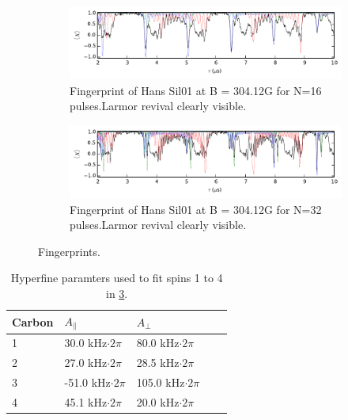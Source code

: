 

\begin{figure}[t]

    \begin{subfigure}[t]{\textwidth}\centering
        \centering
        \includegraphics{Img/fingerprint16.pdf}
        \caption{Fingerprint of Hans Sil01 at B = 304.12G for N=16 pulses.Larmor revival clearly visible. }
        \label{fig:FP16}
    \end{subfigure}

    \begin{subfigure}[t]{\textwidth}\centering
        \centering
        \includegraphics{Img/fingerprint32.pdf}
        \caption{Fingerprint of Hans Sil01 at B = 304.12G for N=32 pulses.Larmor revival clearly visible. }
        \label{fig:FP32}
    \end{subfigure}
    \caption{Fingerprints. }
    \label{fig:FP}
\end{figure}




\begin{table}[htbp]
    \begin{tabular}{lllll}
    Carbon &  $A_{\parallel} $ & $A_{\perp}$ \\ \hline
    1         & 30.0 kHz$\cdot 2 \pi$             & 80.0 kHz$\cdot 2 \pi$                \\
    2         & 27.0 kHz$\cdot 2 \pi$             & 28.5 kHz$\cdot 2 \pi$              \\
    3         & -51.0 kHz$\cdot 2 \pi$          & 105.0 kHz$\cdot 2 \pi$              \\
    4         & 45.1 kHz$\cdot 2 \pi$           & 20.0 kHz$\cdot 2 \pi$                \\
    \end{tabular}
    \caption{Hyperfine paramters used to fit spins 1 to 4 in \cref{fig:FP}.}
    \label{tbl:HF_par}
\end{table}

